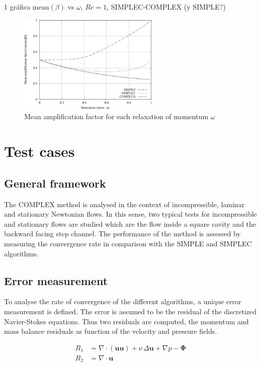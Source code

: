 \documentclass[final,3p,times,10pt,onecolumn]{myElsarticle}
\numberwithin{equation}{section}
\begin{document}
 1 gráfica $\text{mean} (\beta)$ vs $\omega$, $Re=1$, SIMPLEC-COMPLEX (y SIMPLE?)

    \begin{figure}[H]
        \centering
        \includegraphics[width=0.6\textwidth]{fig/meanAmp}
        \caption{Mean amplification factor for each relaxation of momentum $\omega$}
        \label{fig:1d}
    \end{figure}  
    


\section{Test cases}
\label{sec:cases}

\subsection{General framework}
The COMPLEX method is analysed in the context of incompressible, laminar and stationary Newtonian flows. In this sense, two typical tests for incompressible and stationary flows are studied which are the flow inside a square cavity and the backward facing step channel. The performance of the method is assessed by measuring the convergence rate in comparison with the SIMPLE and SIMPLEC algorithms.

\subsection{Error measurement}
To analyse the rate of convergence of the different algorithms, a unique error measurement is defined. The error is assumed to be the residual of the discretized Navier-Stokes equations. Thus two residuals are computed, the momentum and mass balance residuals as function of the velocity and pressure fields. 

\begin{align}
R_1
&=
\nabla
\cdot
\left(
\boldsymbol{u}
\boldsymbol{u}
\right)
+
\nu\, \Delta \boldsymbol{u}
+
\nabla p 
-
\boldsymbol{\Phi}
\\
R_2
&=
\nabla
\cdot
\boldsymbol{u}
\end{align}
\end{document}

